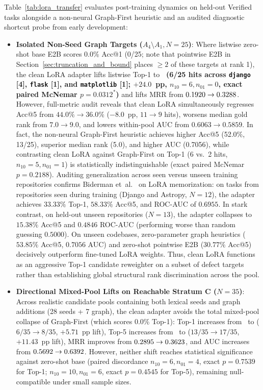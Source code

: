 \documentclass[10pt]{article}
\begin{document}
Table~\ref{tab:lora_transfer} evaluates post-training dynamics on held-out Verified tasks alongside a non-neural Graph-First heuristic and an audited diagnostic shortcut probe from early development:
\begin{itemize}[noitemsep,topsep=1pt,parsep=0pt,partopsep=0pt]
    \item \textbf{Isolated Non-Seed Graph Targets ($A_4 \setminus A_1, N=25$)}: Where listwise zero-shot base E2B scores 0.0\% Acc@1 (0/25; note that pointwise E2B in Section~\ref{sec:truncation_and_bound} places $\ge 2$ of these targets at rank 1), the clean LoRA adapter lifts listwise Top-1 to \textbf{\LoraGenPostAccOne\ (6/25 hits across \texttt{django} [4], \texttt{flask} [1], and \texttt{matplotlib} [1]; $+24.0$~pp, $n_{10}=6, n_{01}=0$, exact paired McNemar $p=\mathbf{0.0312^*}$)} and lifts MRR from $0.1920 \to 0.3288$. However, full-metric audit reveals that clean LoRA simultaneously regresses Acc@5 from $44.0\% \to 36.0\%$ ($-8.0$~pp, $11 \to 9$ hits), worsens median gold rank from $7.0 \to 9.0$, and lowers within-pool AUC from $0.6063 \to 0.5859$. In fact, the non-neural Graph-First heuristic achieves higher Acc@5 (52.0\%, 13/25), superior median rank (5.0), and higher AUC (0.7056), while contrasting clean LoRA against Graph-First on Top-1 (6 vs.\ 2 hits, $n_{10}=5, n_{01}=1$) is statistically indistinguishable (exact paired McNemar $p = 0.2188$). Auditing generalization across seen versus unseen training repositories confirms Biderman et~al.~\cite{biderman2024lora} on LoRA memorization: on tasks from repositories seen during training (Django and Astropy, $N=12$), the adapter achieves $33.33\%$ Top-1, $58.33\%$ Acc@5, and ROC-AUC of $0.6955$. In stark contrast, on held-out unseen repositories ($N=13$), the adapter collapses to $15.38\%$ Acc@5 and $0.4846$ ROC-AUC (performing worse than random guessing $0.5000$). On unseen codebases, zero-parameter graph heuristics ($53.85\%$ Acc@5, $0.7056$ AUC) and zero-shot pointwise E2B ($30.77\%$ Acc@5) decisively outperform fine-tuned LoRA weights. Thus, clean LoRA functions as an aggressive Top-1 candidate reweighter on a subset of defect targets rather than establishing global structural rank discrimination across the pool.
    \item \textbf{Directional Mixed-Pool Lifts on Reachable Stratum C ($N=35$)}: Across realistic candidate pools containing both lexical seeds and graph additions (28 seeds + 7 graph), the clean adapter avoids the total mixed-pool collapse of Graph-First (which scores 0.0\% Top-1): Top-1 increases from \LoraGenStratumCBaseAccOne\ to \textbf{\LoraGenStratumCPostAccOne} ($6/35 \to 8/35$, $+5.71$~pp lift), Top-5 increases from \LoraGenStratumCBaseAccFive\ to \textbf{\LoraGenStratumCPostAccFive} ($13/35 \to 17/35$, $+11.43$~pp lift), MRR improves from $0.2895 \to 0.3623$, and AUC increases from $0.5692 \to 0.6392$. However, neither shift reaches statistical significance against zero-shot base (paired discordance $n_{10}=6, n_{01}=4$, exact $p = 0.7539$ for Top-1; $n_{10}=10, n_{01}=6$, exact $p = 0.4545$ for Top-5), remaining null-compatible under small sample sizes.

\end{itemize}
\end{document}
